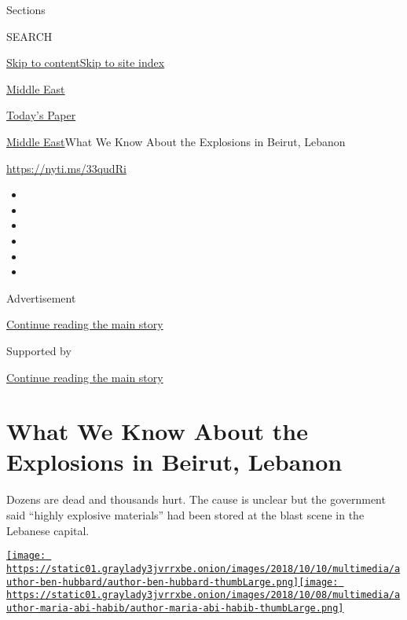 Sections

SEARCH

\protect\hyperlink{site-content}{Skip to
content}\protect\hyperlink{site-index}{Skip to site index}

\href{https://www.nytimes3xbfgragh.onion/section/world/middleeast}{Middle
East}

\href{https://myaccount.nytimes3xbfgragh.onion/auth/login?response_type=cookie\&client_id=vi}{}

\href{https://www.nytimes3xbfgragh.onion/section/todayspaper}{Today's
Paper}

\href{/section/world/middleeast}{Middle East}\textbar{}What We Know
About the Explosions in Beirut, Lebanon

\url{https://nyti.ms/33qudRi}

\begin{itemize}
\item
\item
\item
\item
\item
\item
\end{itemize}

Advertisement

\protect\hyperlink{after-top}{Continue reading the main story}

Supported by

\protect\hyperlink{after-sponsor}{Continue reading the main story}

\hypertarget{what-we-know-about-the-explosions-in-beirut-lebanon}{%
\section{What We Know About the Explosions in Beirut,
Lebanon}\label{what-we-know-about-the-explosions-in-beirut-lebanon}}

Dozens are dead and thousands hurt. The cause is unclear but the
government said ``highly explosive materials'' had been stored at the
blast scene in the Lebanese capital.

\href{https://www.nytimes3xbfgragh.onion/by/ben-hubbard}{\texttt{[image: https://static01.graylady3jvrrxbe.onion/images/2018/10/10/multimedia/author-ben-hubbard/author-ben-hubbard-thumbLarge.png]}}\href{https://www.nytimes3xbfgragh.onion/by/maria-abi-habib}{\texttt{[image: https://static01.graylady3jvrrxbe.onion/images/2018/10/08/multimedia/author-maria-abi-habib/author-maria-abi-habib-thumbLarge.png]}}

